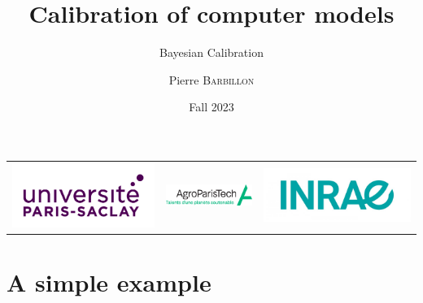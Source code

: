 \documentclass[nopagenumber,9pt]{beamer}
\title[Calibration]{Calibration of computer models}
\subtitle{Bayesian Calibration}
\author[P. Barbillon]{ Pierre \textsc{Barbillon}}
\date{Fall 2023}
\begin{document}
\begin{frame}
\titlepage
\vspace{-1cm}
\centering
\begin{tabular}{ccc}
 \includegraphics[scale=.08]{LogoUPSaclay.jpg}&
  \includegraphics[scale=1.3]{agrologo.png}&
   \includegraphics[scale=.1]{LogoINRAE.jpg}
\end{tabular}


\end{frame}




 \section{A simple example}
\end{document}
